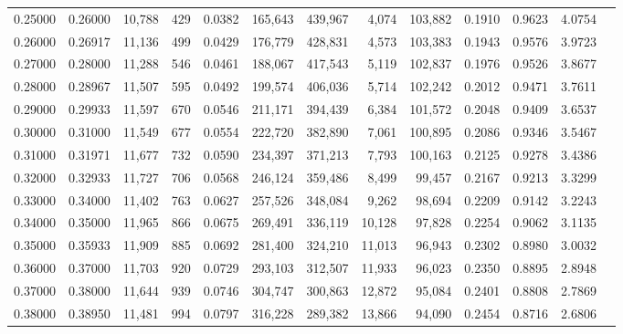 \begin{tabular}{rrrrrrrrrrrrr}
0.25000 & 0.26000 & 10,788 &   429 &                                     0.0382 & 165,643 & 439,967 &   4,074 & 103,882 & 0.1910 & 0.9623 & 4.0754 \\
0.26000 & 0.26917 & 11,136 &   499 &                                     0.0429 & 176,779 & 428,831 &   4,573 & 103,383 & 0.1943 & 0.9576 & 3.9723 \\
0.27000 & 0.28000 & 11,288 &   546 &                                     0.0461 & 188,067 & 417,543 &   5,119 & 102,837 & 0.1976 & 0.9526 & 3.8677 \\
0.28000 & 0.28967 & 11,507 &   595 &                                     0.0492 & 199,574 & 406,036 &   5,714 & 102,242 & 0.2012 & 0.9471 & 3.7611 \\
0.29000 & 0.29933 & 11,597 &   670 &                                     0.0546 & 211,171 & 394,439 &   6,384 & 101,572 & 0.2048 & 0.9409 & 3.6537 \\
0.30000 & 0.31000 & 11,549 &   677 &                                     0.0554 & 222,720 & 382,890 &   7,061 & 100,895 & 0.2086 & 0.9346 & 3.5467 \\
0.31000 & 0.31971 & 11,677 &   732 &                                     0.0590 & 234,397 & 371,213 &   7,793 & 100,163 & 0.2125 & 0.9278 & 3.4386 \\
0.32000 & 0.32933 & 11,727 &   706 &                                     0.0568 & 246,124 & 359,486 &   8,499 &  99,457 & 0.2167 & 0.9213 & 3.3299 \\
0.33000 & 0.34000 & 11,402 &   763 &                                     0.0627 & 257,526 & 348,084 &   9,262 &  98,694 & 0.2209 & 0.9142 & 3.2243 \\
0.34000 & 0.35000 & 11,965 &   866 &                                     0.0675 & 269,491 & 336,119 &  10,128 &  97,828 & 0.2254 & 0.9062 & 3.1135 \\
0.35000 & 0.35933 & 11,909 &   885 &                                     0.0692 & 281,400 & 324,210 &  11,013 &  96,943 & 0.2302 & 0.8980 & 3.0032 \\
0.36000 & 0.37000 & 11,703 &   920 &                                     0.0729 & 293,103 & 312,507 &  11,933 &  96,023 & 0.2350 & 0.8895 & 2.8948 \\
0.37000 & 0.38000 & 11,644 &   939 &                                     0.0746 & 304,747 & 300,863 &  12,872 &  95,084 & 0.2401 & 0.8808 & 2.7869 \\
0.38000 & 0.38950 & 11,481 &   994 &                                     0.0797 & 316,228 & 289,382 &  13,866 &  94,090 & 0.2454 & 0.8716 & 2.6806 \\

\end{tabular}
